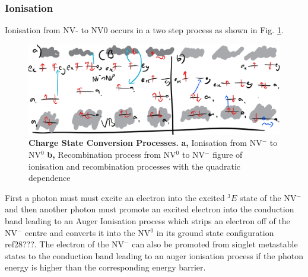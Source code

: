 \documentclass[prl]{revtex4}
\begin{document}
\subsubsection{Ionisation}
Ionisation from NV- to NV0 occurs in a two step process as shown in Fig. \ref{FigChargeConversion}.

\begin{figure}[H]
  \centering
  \includegraphics[width=1\textwidth]{ChargeConversion.png} 
 \caption{\textbf{Charge State Conversion Processes.} \textbf{a,} Ionisation from NV$^-$ to NV$^0$ \textbf{b,} Recombination process from NV$^0$ to NV$^-$ figure of ionisation and recombination processes with the quadratic dependence} \label{FigChargeConversion}
\end{figure}

First a photon must must excite an electron into the excited $^3E$ state of the NV$^-$ and then another photon must promote an excited electron into the conduction band leading to an Auger Ionisation process which strips an electron off of the NV$^-$ centre and converts it into the NV$^0$ in its ground state configuration ref28???. The electron of the NV$^-$ can also be promoted from singlet metastable states to the conduction band leading to an auger ionisation process if the photon energy is higher than the corresponding energy barrier.
\end{document}
